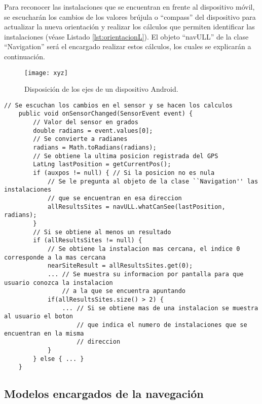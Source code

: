 Para reconocer las instalaciones que se encuentran en frente al dispositivo móvil, se escucharán los cambios de los valores brújula o ``compass'' del dispositivo para actualizar la nueva orientación y realizar los cálculos que permiten identificar las instalaciones (véase Listado \ref{lst:orientacionL}). El objeto ``navULL'' de la clase ``Navigation'' será el encargado realizar estos cálculos, los cuales se explicarán a continuación.


\begin{figure}[h]
    \centering
    \texttt{[image: xyz]}
    \caption{Disposición de los ejes de un dispositivo Android.}
    \label{fig:xyz}
\end{figure}    

\begin{minipage}{\linewidth}
\begin{lstlisting}[caption={Código que se ejecuta cada vez que se registra un cambio en el sensor que calcula la orientación.}, label={lst:orientacionL}]
    // Se escuchan los cambios en el sensor y se hacen los calculos
    public void onSensorChanged(SensorEvent event) {
        // Valor del sensor en grados
        double radians = event.values[0]; 
        // Se convierte a radianes
        radians = Math.toRadians(radians);
        // Se obtiene la ultima posicion registrada del GPS
        LatLng lastPosition = getCurrentPos();
        if (auxpos != null) { // Si la posicion no es nula
            // Se le pregunta al objeto de la clase ``Navigation'' las instalaciones 
            // que se encuentran en esa direccion
            allResultsSites = navULL.whatCanSee(lastPosition, radians);
        }
        // Si se obtiene al menos un resultado
        if (allResultsSites != null) {
            // Se obtiene la instalacion mas cercana, el indice 0 corresponde a la mas cercana
            nearSiteResult = allResultsSites.get(0);
            ... // Se muestra su informacion por pantalla para que usuario conozca la instalacion  
                // a la que se encuentra apuntando
            if(allResultsSites.size() > 2) {
                ... // Si se obtiene mas de una instalacion se muestra al usuario el boton
                    // que indica el numero de instalaciones que se encuentran en la misma
                    // direccion 
            }
        } else { ... }
    } 
\end{lstlisting}
\end{minipage}

\subsection{Modelos encargados de la navegación}

